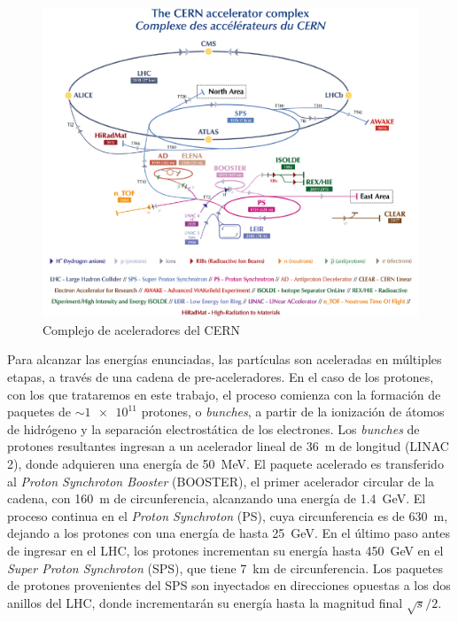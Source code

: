 \begin{figure}[t]
    \includegraphics[width=\linewidth]{Assets/Images/CERN_accelerators.pdf}
    \caption{Complejo de aceleradores del CERN }
    \label{fig:ch2:lhc}
\end{figure}

Para alcanzar las energías enunciadas, las partículas son aceleradas en múltiples etapas, a través de una cadena de pre-aceleradores. En el caso de los protones, con los que trataremos en este trabajo, el proceso comienza con la formación de paquetes de $\sim \num{1e11}$ protones, o \textit{bunches}, a partir de la ionización de átomos de hidrógeno y la separación electrostática de los electrones. Los \textit{bunches} de protones resultantes ingresan a un acelerador lineal de \SI{36}{\meter} de longitud (LINAC 2), donde adquieren una energía de \SI{50}{\MeV}. El paquete acelerado es transferido al \textit{Proton Synchroton Booster} (BOOSTER), el primer acelerador circular de la cadena, con \SI{160}{\meter} de circunferencia, alcanzando una energía de \SI{1.4}{\GeV}. El proceso continua en el \textit{Proton Synchroton} (PS), cuya circunferencia es de \SI{630}{\meter}, dejando a los protones con una energía de hasta \SI{25}{\GeV}. En el último paso antes de ingresar en el LHC, los protones incrementan su energía hasta \SI{450}{\GeV} en el \textit{Super Proton Synchroton} (SPS), que tiene \SI{7}{\kilo\meter} de circunferencia. Los paquetes de protones provenientes del SPS son inyectados en direcciones opuestas a los dos anillos del LHC, donde incrementarán su energía hasta la magnitud final $\sqrt{s}/2$.

